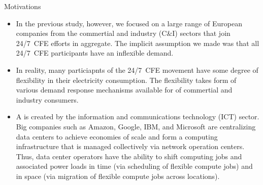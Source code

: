\begin{frame}{Motivations}

  {\footnotesize
  \begin{itemize}
  \item In the previous study, however, we focused on a large range of European companies from the commertial and industry (C\&I) sectors that join 24/7~CFE efforts in aggregate. The implicit assumption we made was that all 24/7~CFE participants have an \alert{inflexible demand}.
  
  \item In reality, many particiapnts of the 24/7~CFE movement have some degree of flexibility in their electricity consumption. The flexibility takes form of various demand response mechanisms available for  of commertial and industry consumers.

  \item  A  is created by the information and communications technology (ICT) sector. Big companies such as Amazon, Google, IBM, and Microsoft are centralizing data centers to achieve economies of scale and form a computing infrastructure that is managed collectively via network operation centers. Thus, data center operators have the ability to \alert{shift computing jobs and associated power loads} in time (via scheduling of flexible compute jobs) and in space (via migration of flexible compute jobs across locations). 
  \end{itemize}

  }

\end{frame}
  

